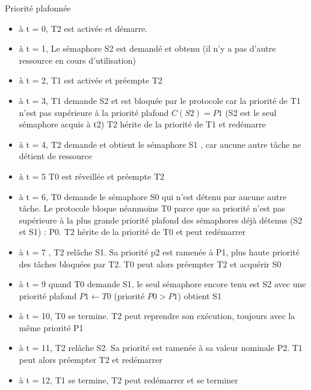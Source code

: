 \begin{frame}{Priorité plafonnée} 
  \begin{itemize}
  \item à t = 0, T2 est activée et démarre.
  \item à t =  1, Le sémaphore S2 est demandé et  obtenu (il n'y a pas
    d'autre ressource en cours d'utilisation)
  \item à t = 2, T1 est activée et préempte T2
  \item à t = 3, T1 demande  S2 et est bloquée par le protocole car la
    priorité de T1 n'est pas supérieure à la priorité plafond $C(S2)=P1$
    (S2 est le seul sémaphore acquis à t2) T2 hérite de la priorité de
    T1 et redémarre
  \item à t  = 4, T2 demande  et obtient le sémaphore S1  , car aucune
    autre tâche ne détient de ressource
  \item à t = 5 T0 est réveillée et préempte T2
  \item  à t =  6, T0  demande le  sémaphore S0  qui n'est  détenu par
    aucune autre tâche. Le protocole  bloque néanmoins T0 parce que sa
    priorité n'est  pas supérieure à  la plus grande  priorité plafond
    des sémaphores  déjà détenus  (S2 et  S1) : P0.   T2 hérite  de la
    priorité de T0 et peut redémarrer
  \item à t = 7 , T2 relâche S1. Sa priorité p2 est ramenée à P1, plus
    haute priorité des tâches bloquées par T2. T0 peut alors préempter
    T2 et acquérir S0
  \item à t = 9 quand T0 demande S1, le seul sémaphore encore tenu est
    S2 avec  une priorité plafond  $P1 \leftarrow T0$ (priorité  $P0 >
    P1$) obtient S1
  \item à  t =  10, T0  se termine. T2  peut reprendre  son exécution,
    toujours avec la même priorité P1
  \item à t =  11, T2 relâche S2. Sa priorité est  ramenée à sa valeur
    nominale P2. T1 peut alors préempter T2 et redémarrer
  \item à t = 12, T1 se termine, T2 peut redémarrer et se terminer
  \end{itemize}
\end{frame}

